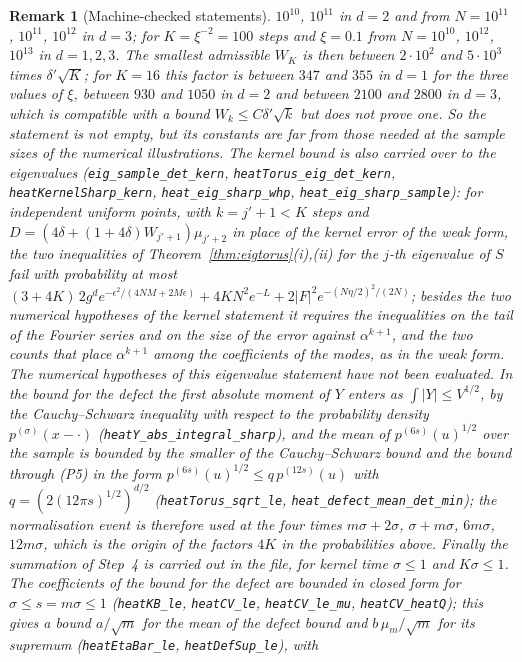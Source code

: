 \documentclass[11pt,a4paper]{article}
\theoremstyle{stmt}
\theoremstyle{defn}
\theoremstyle{rmk}
\newtheorem{remark}[theorem]{Remark}
\numberwithin{equation}{section}
\begin{document}
{\begin{remark}[Machine-checked statements]
$10^{10}$, $10^{11}$ in $d=2$ and from $N=10^{11}$, $10^{11}$, $10^{12}$ in $d=3$; for $K=\xi^{-2}=100$ steps and $\xi=0.1$ from $N=10^{10}$, $10^{12}$, $10^{13}$ in $d=1,2,3$. The smallest admissible $W_K$ is then between $2\cdot10^{2}$ and $5\cdot10^{3}$ times $\delta'\sqrt K$; for $K=16$ this factor is between $347$ and $355$ in $d=1$ for the three values of $\xi$, between $930$ and $1050$ in $d=2$ and between $2100$ and $2800$ in $d=3$, which is compatible with a bound $W_k\le C\delta'\sqrt k$ but does not prove one. So the statement is not empty, but its constants are far from those needed at the sample sizes of the numerical illustrations. The kernel bound is also carried over to the eigenvalues (\texttt{eig\_sample\_det\_kern}, \texttt{heatTorus\_eig\_det\_kern}, \texttt{heatKernelSharp\_kern}, \texttt{heat\_eig\_sharp\_whp}, \texttt{heat\_eig\_sharp\_sample}): for independent uniform points, with $k=j'+1<K$ steps and $D=(4\delta+(1+4\delta)W_{j'+1})\mu_{j'+2}$ in place of the kernel error of the weak form, the two inequalities of Theorem~\ref{thm:eigtorus}(i),(ii) for the $j$-th eigenvalue of $S$ fail with probability at most $(3+4K)\,2g^de^{-\epsilon^2/(4NM+2M\epsilon)}+4KN^2e^{-L}+2|F|^2e^{-(N\eta/2)^2/(2N)}$; besides the two numerical hypotheses of the kernel statement it requires the inequalities on the tail of the Fourier series and on the size of the error against $\alpha^{k+1}$, and the two counts that place $\alpha^{k+1}$ among the coefficients of the modes, as in the weak form. The numerical hypotheses of this eigenvalue statement have not been evaluated. In the bound for the defect the first absolute moment of $Y$ enters as $\int|Y|\le V^{1/2}$, by the Cauchy--Schwarz inequality with respect to the probability density $p^{(\sigma)}(x-\cdot)$ (\texttt{heatY\_abs\_integral\_sharp}), and the mean of $p^{(6s)}(u)^{1/2}$ over the sample is bounded by the smaller of the Cauchy--Schwarz bound and the bound through (P5) in the form $p^{(6s)}(u)^{1/2}\le q\,p^{(12s)}(u)$ with $q=(2(12\pi s)^{1/2})^{d/2}$ (\texttt{heatTorus\_sqrt\_le}, \texttt{heat\_defect\_mean\_det\_min}); the normalisation event is therefore used at the four times $m\sigma+2\sigma$, $\sigma+m\sigma$, $6m\sigma$, $12m\sigma$, which is the origin of the factors $4K$ in the probabilities above. Finally the summation of Step~4 is carried out in the file, for kernel time $\sigma\le1$ and $K\sigma\le1$. The coefficients of the bound for the defect are bounded in closed form for $\sigma\le s=m\sigma\le1$ (\texttt{heatKB\_le}, \texttt{heatCV\_le}, \texttt{heatCV\_le\_mu}, \texttt{heatCV\_heatQ}); this gives a bound $a/\sqrt m$ for the mean of the defect bound and $b\,\mu_m/\sqrt m$ for its supremum (\texttt{heatEtaBar\_le}, \texttt{heatDefSup\_le}), with

\end{remark}}
\end{document}
